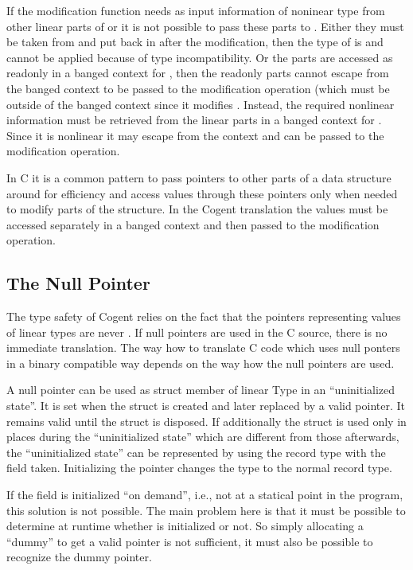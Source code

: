 If the modification function  needs as input information of noninear type from other linear parts of  or  it is not
possible to pass these parts to . Either they must be taken from  and put back in after the modification, then
the type of  is  and  cannot be applied because of type incompatibility. Or the parts are
accessed as readonly in a banged context for , then the readonly parts cannot escape from the banged context to be passed to the
modification operation (which must be outside of the banged context since it modifies . Instead, the required nonlinear information must 
be retrieved from the linear parts in a banged context for . Since it is nonlinear it may escape from the context and can be passed 
to the modification operation.

In C it is a common pattern to pass pointers to other parts of a data structure around for efficiency and access values through these pointers 
only when needed to modify parts of the structure. In the Cogent translation the values must be accessed separately in a banged context and then
passed to the modification operation.

\subsection{The Null Pointer}
\label{app-trans-null}

The type safety of Cogent relies on the fact that the pointers representing values of linear types are never .
If null pointers are used in the C source, there is no immediate translation. The way how to translate C code which uses 
null ponters in a binary compatible way depends on the way how the null pointers are used.

A null pointer can be used as struct member  of linear Type  in an ``uninitialized state''. 
It is set when the struct is created and later
replaced by a valid pointer. It remains valid until the struct is disposed. If additionally the struct is used only in places
during the ``uninitialized state'' which are different from those afterwards, the ``uninitialized state'' can be represented
by using the record type with the field  taken. Initializing the pointer changes the type to the normal record
type.

If the field  is initialized ``on demand'', i.e., not at a statical point in the program, this solution is not possible.
The main problem here is that it must be possible to determine at runtime whether  is initialized or not. So simply
allocating a ``dummy'' to get a valid pointer is not sufficient, it must also be possible to recognize the dummy pointer.

